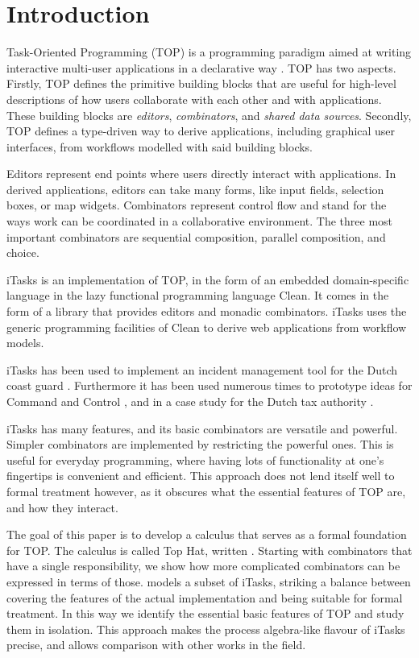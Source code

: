 
\section{Introduction}

Task-Oriented Programming (TOP) is a programming paradigm aimed at writing interactive multi-user applications in a declarative way \cite{conf/ppdp/PlasmeijerLMAK12}.
TOP has two aspects.
Firstly, TOP defines the primitive building blocks that are useful for high-level descriptions of how users collaborate with each other and with applications.
These building blocks are \emph{editors}, \emph{combinators}, and \emph{shared data sources}.
Secondly, TOP defines a type-driven way to derive applications, including graphical user interfaces, from workflows modelled with said building blocks.

Editors represent end points where users directly interact with applications.
In derived applications, editors can take many forms, like input fields, selection boxes, or map widgets.
Combinators represent control flow and stand for the ways work can be coordinated in a collaborative environment.
The three most important combinators are sequential composition, parallel composition, and choice.

iTasks is an implementation of TOP, in the form of an embedded domain-specific language in the lazy functional programming language Clean.
It comes in the form of a library that provides editors and monadic combinators.
iTasks uses the generic programming facilities of Clean to derive web applications from workflow models.

iTasks has been used to implement an incident management tool for the Dutch coast guard \cite{conf/iscram/LijnseJP12}.
Furthermore it has been used numerous times to prototype ideas for Command and Control \cite{theses/nlda/Kool17, theses/radboud/Stutterheim17}, and in a case study for the Dutch tax authority \cite{conf/sfp/StutterheimAP17}.

iTasks has many features, and its basic combinators are versatile and powerful.
Simpler combinators are implemented by restricting the powerful ones.
This is useful for everyday programming, where having lots of functionality at one's fingertips is convenient and efficient.
This approach does not lend itself well to formal treatment however, as it obscures what the essential features of TOP are, and how they interact.

The goal of this paper is to develop a calculus that serves as a formal foundation for TOP.
The calculus is called Top Hat, written \TOPHAT.
Starting with combinators that have a single responsibility, we show how more complicated combinators can be expressed in terms of those.
\TOPHAT models a subset of iTasks, striking a balance between covering the features of the actual implementation and being suitable for formal treatment.
In this way we identify the essential basic features of TOP and study them in isolation.
This approach makes the process algebra-like flavour of iTasks precise, and allows comparison with other works in the field.
